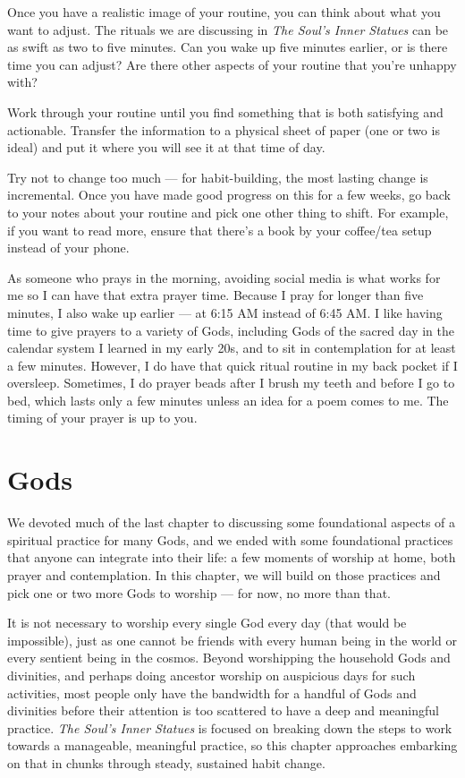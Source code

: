 \documentclass[
]{book}
\begin{document}
Once you have a realistic image of your routine, you can think about what you want to adjust. The rituals we are discussing in \emph{The Soul's Inner Statues} can be as swift as two to five minutes. Can you wake up five minutes earlier, or is there time you can adjust? Are there other aspects of your routine that you're unhappy with?

Work through your routine until you find something that is both satisfying and actionable. Transfer the information to a physical sheet of paper (one or two is ideal) and put it where you will see it at that time of day.

Try not to change too much --- for habit-building, the most lasting change is incremental. Once you have made good progress on this for a few weeks, go back to your notes about your routine and pick one other thing to shift. For example, if you want to read more, ensure that there's a book by your coffee/tea setup instead of your phone.

As someone who prays in the morning, avoiding social media is what works for me so I can have that extra prayer time. Because I pray for longer than five minutes, I also wake up earlier --- at 6:15 AM instead of 6:45 AM. I like having time to give prayers to a variety of Gods, including Gods of the sacred day in the calendar system I learned in my early 20s, and to sit in contemplation for at least a few minutes. However, I do have that quick ritual routine in my back pocket if I oversleep. Sometimes, I do prayer beads after I brush my teeth and before I go to bed, which lasts only a few minutes unless an idea for a poem comes to me. The timing of your prayer is up to you.

\hypertarget{gods}{%
\chapter{Gods}\label{gods}}

We devoted much of the last chapter to discussing some foundational aspects of a spiritual practice for many Gods, and we ended with some foundational practices that anyone can integrate into their life: a few moments of worship at home, both prayer and contemplation. In this chapter, we will build on those practices and pick one or two more Gods to worship --- for now, no more than that.

It is not necessary to worship every single God every day (that would be impossible), just as one cannot be friends with every human being in the world or every sentient being in the cosmos. Beyond worshipping the household Gods and divinities, and perhaps doing ancestor worship on auspicious days for such activities, most people only have the bandwidth for a handful of Gods and divinities before their attention is too scattered to have a deep and meaningful practice. \emph{The Soul's Inner Statues} is focused on breaking down the steps to work towards a manageable, meaningful practice, so this chapter approaches embarking on that in chunks through steady, sustained habit change.
\end{document}
